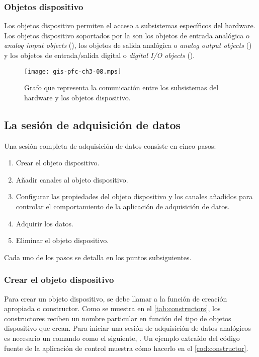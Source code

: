 \subsubsection{Objetos dispositivo}

Los objetos dispositivo permiten el acceso a subsistemas específicos del
hardware. Los objetos dispositivo soportados por la \datx{} son los objetos
de entrada analógica o \emph{analog imput objects} (), los objetos
de salida analógica o \emph{analog output objects} () y los
objetos de entrada/salida digital o \emph{digital I/O objects}
().

\begin{figure}
	\begin{center}
		\texttt{[image: gis-pfc-ch3-08.mps]}
	\end{center}
	\caption[Comunicación entre los subsistemas del hardware y los
	objetos dispositivo]{Grafo que representa la comunicación entre los
	subsistemas del hardware y los objetos dispositivo.}
	\label{fig:subsystemsOO}
\end{figure}


\subsection{La sesión de adquisición de datos}

Una sesión completa de adquisición de datos consiste en cinco pasos:

\begin{enumerate}
	\item Crear el objeto dispositivo.
	\item Añadir canales al objeto dispositivo.
	\item Configurar las propiedades del objeto dispositivo y los
		canales añadidos para controlar el comportamiento de la
		aplicación de adquisición de datos.
	\item Adquirir los datos.
	\item Eliminar el objeto dispositivo.
\end{enumerate}

Cada uno de los pasos se detalla en los puntos subsiguientes.


\subsubsection{Crear el objeto dispositivo}

Para crear un objeto dispositivo, se debe llamar a la función de creación
apropiada o constructor. Como se muestra en el \cref{tab:constructors}, los
constructores reciben un nombre particular en función del tipo de objetos
dispositivo que crean. Para iniciar una sesión de adquisición de datos
analógicos es necesario un comando como el siguiente,
. Un ejemplo extraído del código fuente
de la aplicación de control muestra cómo hacerlo en el
\cref{cod:constructor}.


